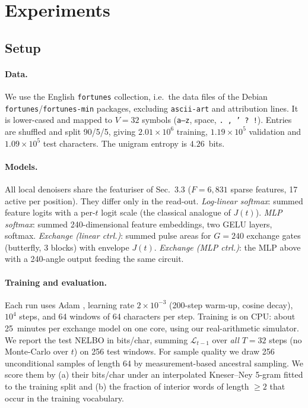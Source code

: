 \section{Experiments}
\subsection{Setup}
\paragraph{Data.} We use the English \texttt{fortunes} collection, i.e.\ the data files of the Debian
\texttt{fortunes}/\texttt{fortunes-min} packages, excluding \texttt{ascii-art} and attribution lines.
It is lower-cased and mapped to $V=32$ symbols (\texttt{a--z}, space, \texttt{.\,,\,'\,?\,!}). Entries are
shuffled and split 90/5/5, giving $2.01\times10^6$ training, $1.19\times10^5$ validation and
$1.09\times10^5$ test characters. The unigram entropy is $4.26$~bits.
\paragraph{Models.} All local denoisers share the featuriser of Sec.~3.3 ($F=6{,}831$ sparse
features, 17 active per position). They differ only in the read-out. \emph{Log-linear softmax}: summed
feature logits with a per-$t$ logit scale (the classical analogue of $J(t)$). \emph{MLP softmax}: summed
240-dimensional feature embeddings, two GELU layers, softmax. \emph{Exchange (linear ctrl.)}: summed
pulse areas for $G=240$ exchange gates (butterfly, 3 blocks) with envelope $J(t)$. \emph{Exchange (MLP
ctrl.)}: the MLP above with a 240-angle output feeding the same circuit.
\paragraph{Training and evaluation.} Each run uses Adam \citep{kingma2015adam}, learning rate
$2\times10^{-3}$ (200-step warm-up, cosine decay), $10^4$ steps, and 64 windows of 64 characters per
step. Training is on CPU: about 25~minutes per exchange model on one core, using our real-arithmetic
simulator. We report the test NELBO in bits/char, summing $\mathcal L_{t-1}$ over \emph{all} $T=32$ steps
(no Monte-Carlo over $t$) on 256 test windows. For sample quality we draw 256 unconditional samples of
length 64 by measurement-based ancestral sampling. We score them by (a) their bits/char under an
interpolated Kneser--Ney 5-gram fitted to the training split \citep{chen1999empirical} and (b) the
fraction of interior words of length $\ge2$ that occur in the training vocabulary.

